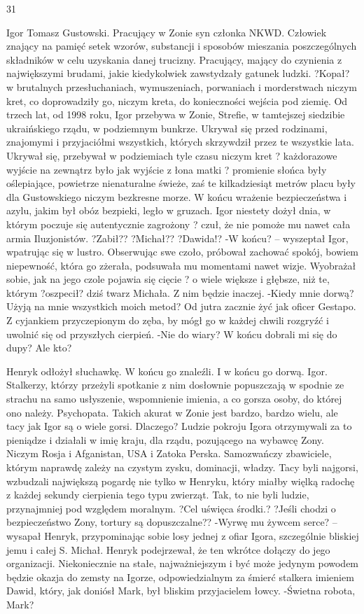 \documentclass[../MAIN.tex]{subfiles}
\begin{document}
31

Igor Tomasz Gustowski.
Pracujący w Zonie syn członka NKWD. Człowiek znający na pamięć setek wzorów, substancji i sposobów mieszania poszczególnych składników w celu uzyskania danej trucizny. Pracujący, mający do czynienia z największymi brudami, jakie kiedykolwiek zawstydzały gatunek ludzki. ?Kopał? w brutalnych przesłuchaniach, wymuszeniach, porwaniach i morderstwach niczym kret, co doprowadziły go, niczym kreta, do konieczności wejścia pod ziemię.
Od trzech lat, od 1998 roku, Igor przebywa w Zonie, Strefie, w tamtejszej siedzibie ukraińskiego rządu, w podziemnym bunkrze. Ukrywał się przed rodzinami, znajomymi i przyjaciółmi wszystkich, których skrzywdził przez te wszystkie lata.
Ukrywał się, przebywał w podziemiach tyle czasu niczym kret ? każdorazowe wyjście na zewnątrz było jak wyjście z łona matki ? promienie słońca były oślepiające, powietrze nienaturalne świeże, zaś te kilkadziesiąt metrów placu były dla Gustowskiego niczym bezkresne morze.
W końcu wrażenie bezpieczeństwa i azylu, jakim był obóz bezpieki, legło w gruzach. Igor niestety dożył dnia, w którym poczuje się autentycznie zagrożony ? czuł, że nie pomoże mu nawet cała armia Iluzjonistów.
?Zabił??
?Michał??
?Dawida!?
-W końcu? -- wyszeptał Igor, wpatrując się w lustro. Obserwując swe czoło, próbował zachować spokój, bowiem niepewność, która go zżerała, podsuwała mu momentami nawet wizje. Wyobrażał sobie, jak na jego czole pojawia się cięcie ? o wiele większe i głębsze, niż te, którym ?oszpecił? dziś twarz Michała. Z nim będzie inaczej.
-Kiedy mnie dorwą? Użyją na mnie wszystkich moich metod?
Od jutra zacznie żyć jak oficer Gestapo. Z cyjankiem przyczepionym do zęba, by mógł go w każdej chwili rozgryźć i uwolnić się od przyszłych cierpień.
-Nie do wiary? W końcu dobrali mi się do dupy?
Ale kto?


Henryk odłożył słuchawkę.
W końcu go znaleźli. I w końcu go dorwą.
Igor.
Stalkerzy, którzy przeżyli spotkanie z nim dosłownie popuszczają w spodnie ze strachu na samo usłyszenie, wspomnienie imienia, a co gorsza osoby, do której ono należy.
Psychopata.
Takich akurat w Zonie jest bardzo, bardzo wielu, ale tacy jak Igor są o wiele gorsi. Dlaczego?
Ludzie pokroju Igora otrzymywali za to pieniądze i działali w imię kraju, dla rządu, pozującego na wybawcę Zony. Niczym Rosja i Afganistan, USA i Zatoka Perska. Samozwańczy zbawiciele, którym naprawdę zależy na czystym zysku, dominacji, władzy.
Tacy byli najgorsi, wzbudzali największą pogardę nie tylko w Henryku, który miałby więlką radochę z każdej sekundy cierpienia tego typu zwierząt. Tak, to nie byli ludzie, przynajmniej pod względem moralnym.
?Cel uświęca środki.?
?Jeśli chodzi o bezpieczeństwo Zony, tortury są dopuszczalne??
-Wyrwę mu żywcem serce? -- wysapał Henryk, przypominając sobie losy jednej z ofiar Igora, szczególnie bliskiej jemu i całej S.
Michał.
Henryk podejrzewał, że ten wkrótce dołączy do jego organizacji. Niekoniecznie na stałe, najważniejszym i być może jedynym powodem będzie okazja do zemsty na Igorze, odpowiedzialnym za śmierć stalkera imieniem Dawid, który, jak doniósł Mark, był bliskim przyjacielem łowcy.
-Świetna robota, Mark?
\end{document}
